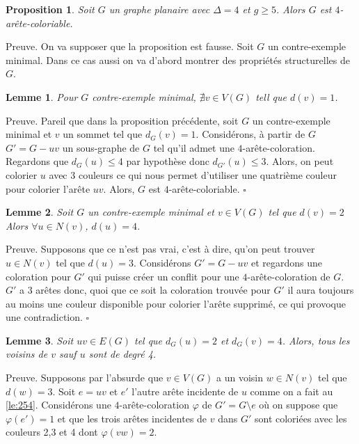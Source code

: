 \documentclass[10pt,a4paper]{article}
\newtheorem{proposition}{Proposition}
\newtheorem{lemme}{Lemme}
\newcommand{\ep}{{\hfill $\square$}}
\begin{document}

\begin{proposition}
Soit $G$ un graphe planaire avec $\Delta = 4$ et $g \geq 5$. Alors $G$ est $4$-arête-coloriable.
\end{proposition}

Preuve. On va supposer que la proposition est fausse. Soit $G$ un contre-exemple minimal. Dans ce cas aussi on va d'abord montrer des propriétés structurelles de $G$.

\begin{lemme}
Pour $G$ contre-exemple minimal,  $\nexists v \in V(G)$ tell que $d(v) = 1$.
\label{le:14}
\end{lemme}

Preuve.
Pareil que dans la proposition précédente, soit $G$ un contre-exemple minimal et $v$ un sommet tel que $d_G(v) = 1$. Considérons, à partir de $G$ $G' = G-uv$ un sous-graphe de $G$ tel qu'il admet une $4$-arête-coloration. Regardons que $d_G(u) \leq 4$ par hypothèse donc $d_{G'}(u) \leq 3$. Alors, on peut colorier $u$ avec $3$ couleurs ce qui nous permet d'utiliser une quatrième couleur pour colorier l'arête $uv$. Alors, $G$ est $4$-arête-coloriable.
\ep

\begin{lemme}
Soit $G$ un contre-exemple minimal et $v \in V(G)$ tel que $d(v) = 2$ Alors $\forall u \in N(v)$, $d(u) = 4$.
\label{le:23}
\end{lemme} 

Preuve.
Supposons que ce n'est pas vrai, c'est à dire, qu'on peut trouver $u \in N(v)$ tel que $d(u) = 3$. Considérons $G' = G-uv$ et regardons une coloration pour $G'$ qui puisse créer un conflit pour une $4$-arête-coloration de $G$. $G'$ a 3 arêtes donc, quoi que ce soit la coloration trouvée pour $G'$ il aura toujours au moins une couleur disponible pour colorier l'arête supprimé, ce qui provoque une contradiction.
\ep

\begin{lemme}
Soit $uv \in E(G)$ tel que $d_G(u) = 2$ et $d_G(v) = 4$. Alors, tous les voisins de $v$ sauf $u$ sont de degré 4.
\label{le:243}
\end{lemme}

Preuve.
Supposons par l'absurde que $v \in V(G)$ a un voisin $w \in N(v)$ tel que $d(w) = 3$. Soit $e = uv$ et $e'$ l'autre arête incidente de $u$ comme on a fait au \ref{le:254}. Considérons une $4$-arête-coloration $\varphi$ de $G' = G \setminus e$  où on suppose que $\varphi(e') = 1$ et que les trois arêtes incidentes de $v$ dans $G'$ sont coloriées avec les couleurs 2,3 et 4 dont $\varphi(vw) = 2$. 
\end{document}
